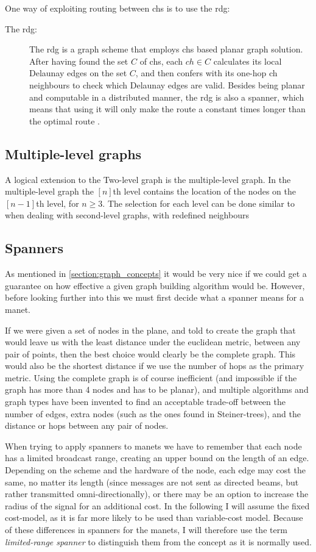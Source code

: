 One way of exploiting routing between \acp{ch} is to use the \ac{rdg}:
\begin{description}
\item[The \ac{rdg}:] The \ac{rdg} is a graph scheme that employs \acp{ch} based planar graph solution. After having found the set $C$ of \acp{ch}, each $ch \in C$ calculates its local Delaunay edges on the set $C$, and then confers with its one-hop \ac{ch} neighbours to check which Delaunay edges are valid. Besides being planar and computable in a distributed manner, the \ac{rdg} is also a spanner, which means that using it will only make the route a constant times longer than the optimal route \cite{GeoSpanners}.
\end{description}

\subsection{Multiple-level graphs}
A logical extension to the Two-level graph is the multiple-level graph. In the multiple-level graph the $[n]$th level contains the location of the nodes on the $[n-1]$th level, for $n \geq 3$. The selection for each level can be done similar to when dealing with second-level graphs, with redefined neighbours    

\subsection{Spanners}
\label{section:spanners}
As mentioned in \ref{section:graph_concepts} it would be very nice if we could get a guarantee on how effective a given graph building algorithm would be. However, before looking further into this we must first decide what a spanner means for a \ac{manet}.

If we were given a set of nodes in the plane, and told to create the graph that would leave us with the least distance under the euclidean metric, between any pair of points, then the best choice would clearly be the complete graph. This would also be the shortest distance if we use the number of hops as the primary metric. Using the complete graph is of course inefficient (and impossible if the graph has more than 4 nodes and has to be planar), and multiple algorithms and graph types have been invented to find an acceptable trade-off between the number of edges, extra nodes (such as the ones found in Steiner-trees), and the distance or hops between any pair of nodes.

When trying to apply spanners to \acp{manet} we have to remember that each node has a limited broadcast range, creating an upper bound on the length of an edge. Depending on the scheme and the hardware of the node, each edge may cost the same, no matter its length (since messages are not sent as directed beams, but rather transmitted omni-directionally), or there may be an option to increase the radius of the signal for an additional cost. In the following I will assume the fixed cost-model, as it is far more likely to be used than variable-cost model. Because of these differences in spanners for the \acp{manet}, I will therefore use the term \emph{limited-range spanner} to distinguish them from the concept as it is normally used. 

